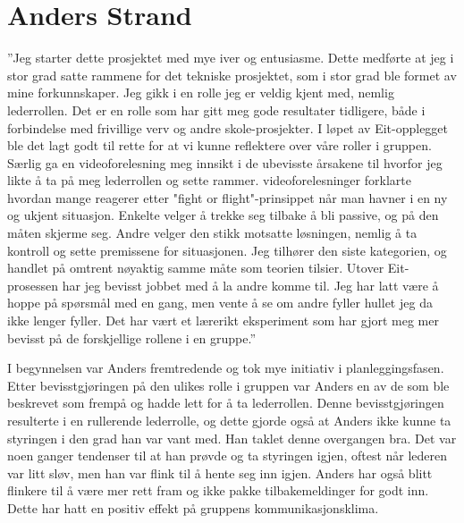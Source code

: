 \section{Anders Strand}
''Jeg starter dette prosjektet med mye iver og entusiasme. 
Dette medførte at jeg i stor grad satte rammene for det tekniske prosjektet, som i stor grad ble formet av mine forkunnskaper.
Jeg gikk i en rolle jeg er veldig kjent med, nemlig lederrollen. 
Det er en rolle som har gitt meg gode resultater tidligere, både i forbindelse med frivillige verv og andre skole-prosjekter.
I løpet av Eit-opplegget ble det lagt godt til rette for at vi kunne reflektere over våre roller i gruppen.
Særlig ga en videoforelesning meg innsikt i de ubevisste årsakene til hvorfor jeg likte å ta på meg lederrollen og sette rammer. 
videoforelesninger forklarte hvordan mange reagerer etter "fight or flight"-prinsippet når man havner i en ny og ukjent situasjon.
Enkelte velger å trekke seg tilbake å bli passive, og på den måten skjerme seg. 
Andre velger den stikk motsatte løsningen, nemlig å ta kontroll og sette premissene for situasjonen. 
Jeg tilhører den siste kategorien, og handlet på omtrent nøyaktig samme måte som teorien tilsier.
Utover Eit-prosessen har jeg bevisst jobbet med å la andre komme til.
Jeg har latt være å hoppe på spørsmål med en gang, men vente å se om andre fyller hullet jeg da ikke lenger fyller. Det har vært et lærerikt eksperiment som har gjort meg mer bevisst på de forskjellige rollene i en gruppe.''
\vspace{\secspace}

I begynnelsen var Anders fremtredende og tok mye initiativ i planleggingsfasen. 
Etter bevisstgjøringen på den ulikes rolle i gruppen var Anders en av de som ble beskrevet som frempå og hadde lett for å ta lederrollen. 
Denne bevisstgjøringen resulterte i en rullerende lederrolle, og dette gjorde også at Anders ikke kunne ta styringen i den grad han var vant med. 
Han taklet denne overgangen bra. 
Det var noen ganger tendenser til at han prøvde og ta styringen igjen, oftest når lederen var litt sløv, men han var flink til å hente seg inn igjen. 
Anders har også blitt flinkere til å være mer rett fram og ikke pakke tilbakemeldinger for godt inn. 
Dette har hatt en positiv effekt på gruppens kommunikasjonsklima. 

